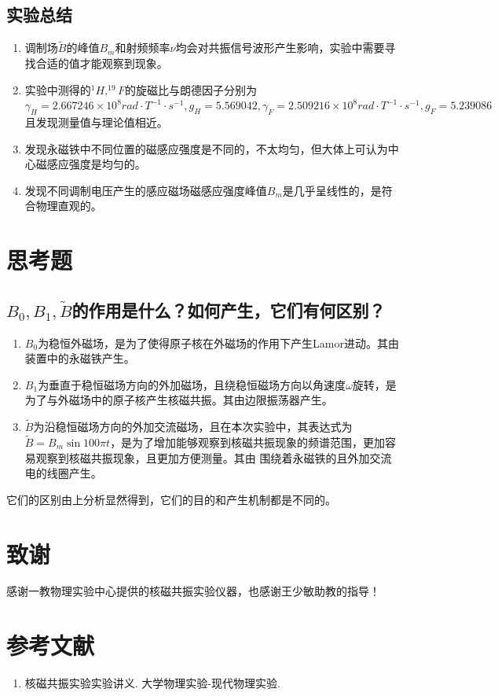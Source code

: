 \documentclass[a4paper,UTF8]{ctexart}
\begin{document}
\subsection{实验总结}

\begin{enumerate}
    \item 调制场$\tilde{B}$的峰值$B_m$和射频频率$\nu$均会对共振信号波形产生影响，实验中需要寻找合适的值才能观察到现象。
    \item 实验中测得的$^1H,^{19}F$的旋磁比与朗德因子分别为
    $\gamma_H = 2.667246\times 10^8 rad \cdot T^{-1}\cdot s^{-1},g_H = 5.569042,\gamma_F = 2.509216\times 10^8 rad \cdot T^{-1}\cdot s^{-1},g_F = 5.239086$
    且发现测量值与理论值相近。
    \item 发现永磁铁中不同位置的磁感应强度是不同的，不太均匀，但大体上可认为中心磁感应强度是均匀的。
    \item 发现不同调制电压产生的感应磁场磁感应强度峰值$B_m$是几乎呈线性的，是符合物理直观的。
\end{enumerate}

\section{思考题}

\subsection{$B_0,B_1,\tilde{B}$的作用是什么？如何产生，它们有何区别？}

\begin{enumerate}
    \item $B_0$为稳恒外磁场，是为了使得原子核在外磁场的作用下产生Lamor进动。其由装置中的永磁铁产生。
    \item $B_1$为垂直于稳恒磁场方向的外加磁场，且绕稳恒磁场方向以角速度$\omega$旋转，是为了与外磁场中的原子核产生核磁共振。其由边限振荡器产生。
    \item $\tilde{B}$为沿稳恒磁场方向的外加交流磁场，且在本次实验中，其表达式为$\tilde{B} = B_m \sin{100\pi t}$，是为了增加能够观察到核磁共振现象的频谱范围，更加容易观察到核磁共振现象，且更加方便测量。其由
    围绕着永磁铁的且外加交流电的线圈产生。
\end{enumerate}

它们的区别由上分析显然得到，它们的目的和产生机制都是不同的。

\section{致谢}

感谢一教物理实验中心提供的核磁共振实验仪器，也感谢王少敏助教的指导！

\section{参考文献}

\begin{enumerate}
    \item 核磁共振实验实验讲义. 大学物理实验-现代物理实验.
\end{enumerate}
\end{document}
